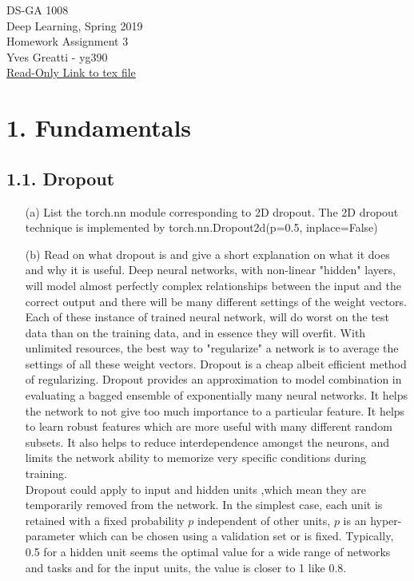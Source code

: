 \documentclass[11pt]{article}
\newcommand{\0}{\mat{0}}
\begin{document}
\noindent DS-GA 1008\\
Deep Learning, Spring 2019\\
Homework Assignment 3 \\
Yves Greatti - yg390\\
\href{https://www.overleaf.com/project/5c8521e162afe55c8eda31eb}{Read-Only Link to tex file}


\section*{1. Fundamentals}

\subsection*{1.1. Dropout}

\begin{itemize}
    \item[(a)]    List the torch.nn module corresponding to 2D dropout. The 2D dropout  technique is implemented by torch.nn.Dropout2d(p=0.5, inplace=False)
    \item[(b)]  Read on what dropout is and give a short explanation on what it does and why
it is useful.
Deep neural networks, with non-linear "hidden" layers, will model almost perfectly complex relationships between the input and the correct output and there will be many different settings of the weight vectors. Each of these instance of trained neural network, will do worst on the test data than on the training data, and in essence they will overfit. With unlimited resources, the best way to "regularize" a network is to average the settings of all these weight vectors. Dropout is a cheap albeit efficient method of regularizing. Dropout provides an approximation to model combination  in evaluating a bagged ensemble of exponentially many neural networks.  It helps the network to not give too much importance to a particular feature. It helps to learn robust features which are more useful with many different random subsets. It also helps to reduce interdependence amongst the neurons, and limits the network ability to memorize very specific conditions during training.\\
Dropout could apply to input and hidden units ,which mean they are temporarily removed from the network. In the simplest case, each unit is retained with a fixed probability $p$ independent of other units, $p$ is an hyper-parameter which can be chosen using a validation set or is fixed. Typically, 0.5 for a hidden unit seems the optimal value for a wide range of networks and tasks and for the input units, the  value is closer to 1 like 0.8.\\

\end{itemize}
\end{document}
